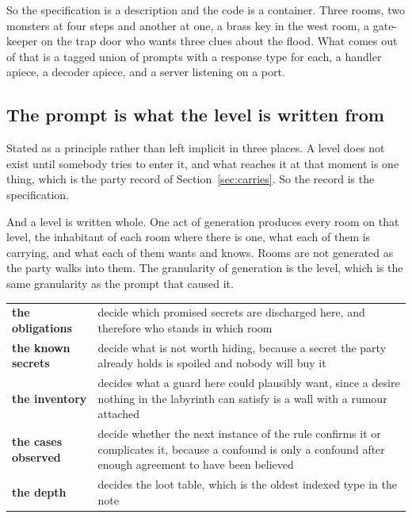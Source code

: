 \documentclass[11pt,a4paper]{article}
\begin{document}
\begin{sectionbox}
So the specification is a description and the code is a container. Three rooms, two monsters at
four steps and another at one, a brass key in the west room, a gate-keeper on the trap door who wants
three clues about the flood. What comes out of that is a tagged union of prompts with a response
type for each, a handler apiece, a decoder apiece, and a server listening on a port.
\end{sectionbox}

\subsection{The prompt is what the level is written from}
\label{sec:written}

Stated as a principle rather than left implicit in three places. A level does not exist until
somebody tries to enter it, and what reaches it at that moment is one thing, which is the party
record of Section~\ref{sec:carries}. So the record is the specification.

And a level is written whole. One act of generation produces every room on that level, the
inhabitant of each room where there is one, what each of them is carrying, and what each of them
wants and knows. Rooms are not generated as the party walks into them. The granularity of
generation is the level, which is the same granularity as the prompt that caused it.

\begin{center}
\begin{tabular}{@{}l@{\hspace{4mm}}>{\raggedright\arraybackslash}p{}@{}}
\toprule
\textbf{the obligations}   & decide which promised secrets are discharged here, and therefore who
stands in which room \\[1mm]
\textbf{the known secrets} & decide what is not worth hiding, because a secret the party already
holds is spoiled and nobody will buy it \\[1mm]
\textbf{the inventory}     & decides what a guard here could plausibly want, since a desire nothing
in the labyrinth can satisfy is a wall with a rumour attached \\[1mm]
\textbf{the cases observed} & decide whether the next instance of the rule confirms it or complicates
it, because a confound is only a confound after enough agreement to have been believed \\[1mm]
\textbf{the depth}         & decides the loot table, which is the oldest indexed type in the note \\
\bottomrule
\end{tabular}
\end{center}
\end{document}
